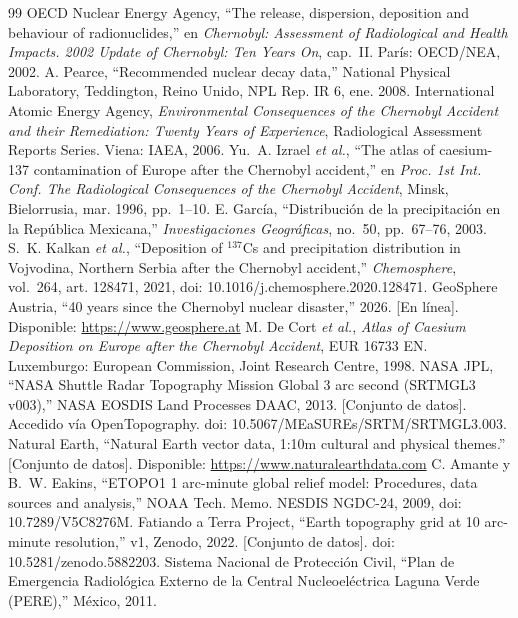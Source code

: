 \begin{thebibliography}{99}
 OECD Nuclear Energy Agency, ``The release, dispersion, deposition and behaviour of radionuclides,'' en \textit{Chernobyl: Assessment of Radiological and Health Impacts. 2002 Update of Chernobyl: Ten Years On}, cap.~II. Par\'is: OECD/NEA, 2002.
 A. Pearce, ``Recommended nuclear decay data,'' National Physical Laboratory, Teddington, Reino Unido, NPL Rep. IR 6, ene. 2008.
 International Atomic Energy Agency, \textit{Environmental Consequences of the Chernobyl Accident and their Remediation: Twenty Years of Experience}, Radiological Assessment Reports Series. Viena: IAEA, 2006.
 Yu.~A. Izrael \textit{et al.}, ``The atlas of caesium-137 contamination of Europe after the Chernobyl accident,'' en \textit{Proc. 1st Int. Conf. The Radiological Consequences of the Chernobyl Accident}, Minsk, Bielorrusia, mar. 1996, pp.~1--10.
 E. Garc\'ia, ``Distribuci\'on de la precipitaci\'on en la Rep\'ublica Mexicana,'' \textit{Investigaciones Geogr\'aficas}, no.~50, pp.~67--76, 2003.
 S.~K. Kalkan \textit{et al.}, ``Deposition of $^{137}$Cs and precipitation distribution in Vojvodina, Northern Serbia after the Chernobyl accident,'' \textit{Chemosphere}, vol.~264, art. 128471, 2021, doi: 10.1016/j.chemosphere.2020.128471.
 GeoSphere Austria, ``40 years since the Chernobyl nuclear disaster,'' 2026. [En l\'inea]. Disponible: \url{https://www.geosphere.at}
 M. De Cort \textit{et al.}, \textit{Atlas of Caesium Deposition on Europe after the Chernobyl Accident}, EUR 16733 EN. Luxemburgo: European Commission, Joint Research Centre, 1998.
 NASA JPL, ``NASA Shuttle Radar Topography Mission Global 3 arc second (SRTMGL3 v003),'' NASA EOSDIS Land Processes DAAC, 2013. [Conjunto de datos]. Accedido v\'ia OpenTopography. doi: 10.5067/MEaSUREs/SRTM/SRTMGL3.003.
 Natural Earth, ``Natural Earth vector data, 1:10m cultural and physical themes.'' [Conjunto de datos]. Disponible: \url{https://www.naturalearthdata.com}
 C. Amante y B.~W. Eakins, ``ETOPO1 1 arc-minute global relief model: Procedures, data sources and analysis,'' NOAA Tech. Memo. NESDIS NGDC-24, 2009, doi: 10.7289/V5C8276M.
 Fatiando a Terra Project, ``Earth topography grid at 10 arc-minute resolution,'' v1, Zenodo, 2022. [Conjunto de datos]. doi: 10.5281/zenodo.5882203.
 Sistema Nacional de Protecci\'on Civil, ``Plan de Emergencia Radiol\'ogica Externo de la Central Nucleoel\'ectrica Laguna Verde (PERE),'' M\'exico, 2011.

\end{thebibliography}
